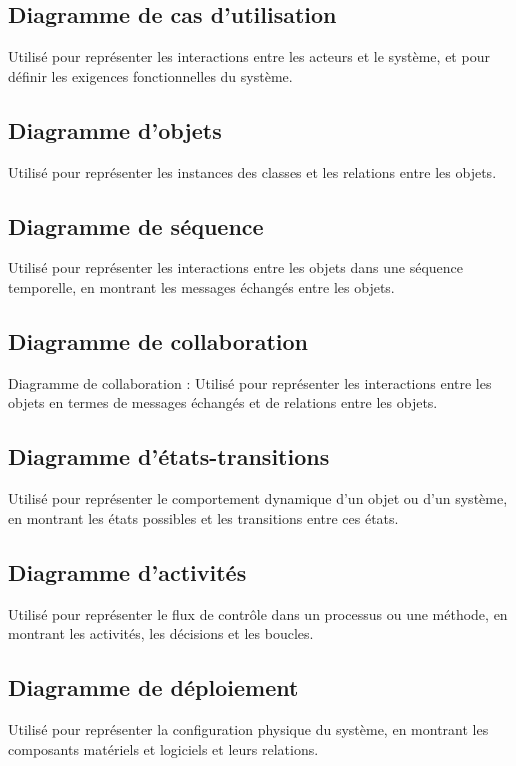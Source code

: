 \subsection{Diagramme de cas d'utilisation}\label{subsec:diagrammes-de-cas-utilisation}
Utilisé pour représenter les interactions entre les acteurs et le système, et pour définir les exigences fonctionnelles du système.
\subsection{Diagramme d'objets}\label{subsec:diagrammes-d-objets}
Utilisé pour représenter les instances des classes et les relations entre les objets.
\subsection{Diagramme de séquence}\label{subsec:diagrammes-de-sequence}
Utilisé pour représenter les interactions entre les objets dans une séquence temporelle, en montrant les messages échangés entre les objets.
\subsection{Diagramme de collaboration}\label{subsec:diagrammes-de-collaboration}
Diagramme de collaboration : Utilisé pour représenter les interactions entre les objets en termes de messages échangés et de relations entre les objets.
\subsection{Diagramme d'états-transitions}\label{subsec:diagrammes-d-etat-transition}
Utilisé pour représenter le comportement dynamique d'un objet ou d'un système, en montrant les états possibles et les transitions entre ces états.
\subsection{Diagramme d'activités}\label{subsec:diagrammes-d-activites}
Utilisé pour représenter le flux de contrôle dans un processus ou une méthode, en montrant les activités, les décisions et les boucles.
\subsection{Diagramme de déploiement}\label{subsec:diagrammes-de-deploiement}
Utilisé pour représenter la configuration physique du système, en montrant les composants matériels et logiciels et leurs relations.

